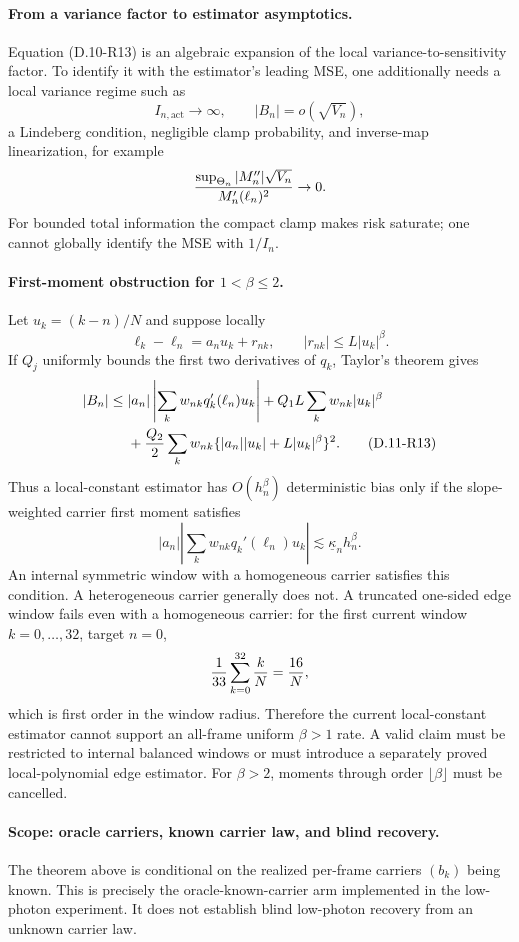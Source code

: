 \paragraph{From a variance factor to estimator asymptotics.}
Equation (D.10-R13) is an algebraic expansion of the local
variance-to-sensitivity factor.  To identify it with the estimator's
leading MSE, one additionally needs a local variance regime such as
\[
 I_{n,\mathrm{act}}\to\infty,\qquad
 |B_n|=o(\sqrt{V_n}),
\]
a Lindeberg condition, negligible clamp probability, and inverse-map
linearization, for example
\[
 {\sup_{\Theta_n}|M_n''|\sqrt{V_n}
  \over M_n'(\ell_n)^2}\to0.
\]
For bounded total information the compact clamp makes risk saturate;
one cannot globally identify the MSE with $1/I_n$.

\paragraph{First-moment obstruction for $1<\beta\le2$.}
Let $u_k=(k-n)/N$ and suppose locally
\[
 \ell_k-\ell_n=a_nu_k+r_{nk},\qquad
 |r_{nk}|\le L|u_k|^\beta.
\]
If $Q_j$ uniformly bounds the first two derivatives of $q_k$, Taylor's
theorem gives
\begin{align}
 |B_n|\le{}&
 |a_n|\left|\sum_kw_{nk}q_k'(\ell_n)u_k\right|
 +Q_1L\sum_kw_{nk}|u_k|^\beta\notag\\
 &+{Q_2\over2}\sum_kw_{nk}
   \{|a_n||u_k|+L|u_k|^\beta\}^2.
 \tag{D.11-R13}
\end{align}
Thus a local-constant estimator has $O(h_n^\beta)$ deterministic bias
only if the slope-weighted carrier first moment satisfies
\[
 |a_n|\left|\sum_kw_{nk}q_k'(\ell_n)u_k\right|
 \lesssim\underline\kappa_n h_n^\beta.
\]
An internal symmetric window with a homogeneous carrier satisfies this
condition.  A heterogeneous carrier generally does not.  A truncated
one-sided edge window fails even with a homogeneous carrier: for the
first current window $k=0,\ldots,32$, target $n=0$,
\[
 {1\over33}\sum_{k=0}^{32}{k\over N}={16\over N},
\]
which is first order in the window radius.  Therefore the current
local-constant estimator cannot support an all-frame uniform
$\beta>1$ rate.  A valid claim must be restricted to internal balanced
windows or must introduce a separately proved local-polynomial edge
estimator.  For $\beta>2$, moments through order $\lfloor\beta\rfloor$
must be cancelled.

\paragraph{Scope: oracle carriers, known carrier law, and blind recovery.}
The theorem above is conditional on the realized per-frame carriers
$(b_k)$ being known.  This is precisely the oracle-known-carrier arm
implemented in the low-photon experiment.  It does not establish blind
low-photon recovery from an unknown carrier law.

